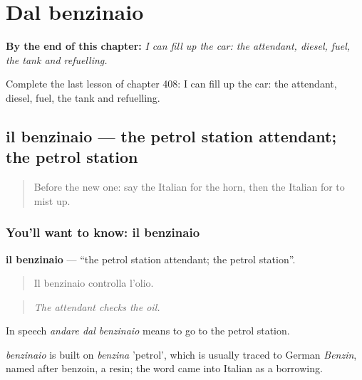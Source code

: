
\chapter{Dal benzinaio}
\label{ch:it-dal-benzinaio}

\begin{chapteropening}
\textbf{By the end of this chapter:} \emph{I can fill up the car: the attendant, diesel, fuel, the tank and refuelling.}

Complete the last lesson of chapter 408: I can fill up the car: the attendant, diesel, fuel, the tank and refuelling.
\end{chapteropening}

\section[il benzinaio]{il benzinaio — the petrol station attendant; the petrol station}

\label{lesson:IT-C408-benzinaio}



\begin{quote}
Before the new one: say the Italian for the horn, then the Italian for to mist up.
\end{quote}

\subsection*{You'll want to know: il benzinaio}
\textbf{il benzinaio} — \textquotedblleft{}the petrol station attendant; the petrol station\textquotedblright{}.

\begin{quote}
Il benzinaio controlla l'olio.
\end{quote}

\begin{quote}
\emph{The attendant checks the oil.}
\end{quote}

In speech \emph{andare dal benzinaio} means to go to the petrol station.

\begin{cousinweb}
\emph{benzinaio} is built on \emph{benzina} 'petrol', which is usually traced to German \emph{Benzin}, named after benzoin, a resin; the word came into Italian as a borrowing.
\end{cousinweb}

